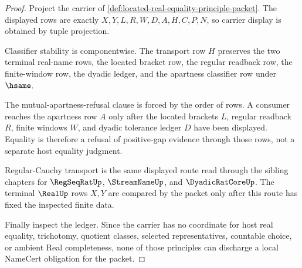 \begin{proof}
Project the carrier of \autoref{def:located-real-equality-principle-packet}. The displayed rows are exactly $X,Y,L,R,W,D,A,H,C,P,N$, so carrier display is obtained by tuple projection.

Classifier stability is componentwise. The transport row $H$ preserves the two terminal real-name rows, the located bracket row, the regular readback row, the finite-window row, the dyadic ledger, and the apartness classifier row under $\hsame$.

The mutual-apartness-refusal clause is forced by the order of rows. A consumer reaches the apartness row $A$ only after the located brackets $L$, regular readback $R$, finite windows $W$, and dyadic tolerance ledger $D$ have been displayed. Equality is therefore a refusal of positive-gap evidence through those rows, not a separate host equality judgment.

Regular-Cauchy transport is the same displayed route read through the sibling chapters for $\RegSeqRatUp$, $\StreamNameUp$, and $\DyadicRatCoreUp$. The terminal $\RealUp$ rows $X,Y$ are compared by the packet only after this route has fixed the inspected finite data.

Finally inspect the ledger. Since the carrier has no coordinate for host real equality, trichotomy, quotient classes, selected representatives, countable choice, or ambient Real completeness, none of those principles can discharge a local NameCert obligation for the packet.
\end{proof}




